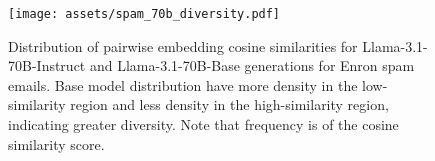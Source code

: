 \begin{figure}[t]
\vskip 0.2in
\begin{center}
\centerline{\texttt{[image: assets/spam\_70b\_diversity.pdf]}}
\caption{Distribution of pairwise embedding cosine similarities for Llama-3.1-70B-Instruct and Llama-3.1-70B-Base generations for Enron spam emails. Base model distribution have more density in the low-similarity region and less density in the high-similarity region, indicating greater diversity. Note that frequency is of the cosine similarity score.}
\label{results-spam-diversity}
\end{center}
\vskip -0.2in
\end{figure}
